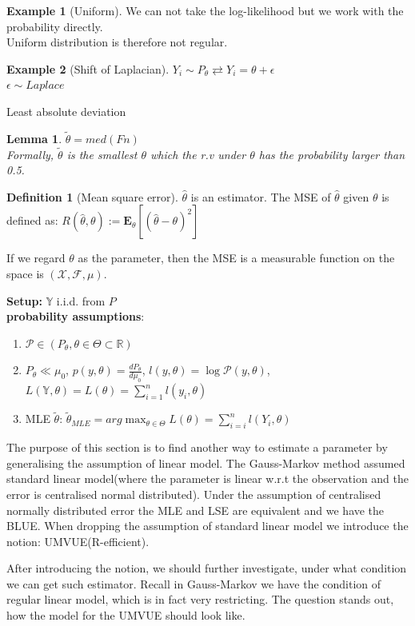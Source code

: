 \documentclass[a4paper,12pt, oneside, fleqn]{book}
\newtheorem{lemma}[theorem]{Lemma}
\theoremstyle{definition}
\newtheorem{definition}{Definition}[section]
\newtheorem*{example}{Example}
\theoremstyle{remark}
\begin{document}
\begin{example}[Uniform]
	We can not take the log-likelihood but we work with the probability directly.\\
	Uniform distribution is therefore not regular. 
\end{example}

\begin{example}[Shift of Laplacian]
	$Y_i \sim P_\theta \rightleftarrows Y_i = \theta + \epsilon$\\
	$\epsilon \sim Laplace$
	
	Least absolute deviation
\end{example}

\begin{lemma}
	$\tilde{\theta} = med (Fn)$ \\
	Formally, $\tilde{\theta}$ is the smallest $\theta$ which the r.v under $\theta$ has the probability larger than 0.5.
\end{lemma}


\begin{definition}[Mean square error]
\(\hat{\theta} \) is an estimator. The MSE of \( \hat{\theta} \) given \( \theta \) is defined as:
\( R(\hat{\theta}, \theta) := \mathbf{E}_{\theta}[(\hat{\theta} - \theta)^2] \)\par
If we regard $\theta$ as the parameter, then the MSE is a measurable function on the space is \( (\mathcal{X}, \mathcal{F}, \mu) \). 
\end{definition}



\textbf{Setup:} $\mathbb{Y}$ i.i.d. from $P$\\
\textbf{probability assumptions}:
\begin{enumerate}
	\item $\mathcal{P} \in (P_\theta, \theta \in \Theta \subset \mathbb{R})$
	\item $P_\theta \ll \mu_0$, \quad $p(y, \theta) = \frac{dP_\theta}{d\mu_0}$, \quad $l(y, \theta) = \log \mathcal{P}(y, \theta)$, \quad $L(\mathbb{Y}, \theta) = L(\theta) = \sum_{i = 1}^n l(y_i, \theta)$
	\item MLE $\tilde{\theta}$: $\tilde{\theta}_{MLE} = arg \max_{\theta \in \Theta} L(\theta) = \sum_{i = i}^n l(Y_i, \theta)$
\end{enumerate} 


The purpose of this section is to find another way to estimate a parameter by generalising the assumption of linear model. The Gauss-Markov method assumed standard linear model(where the parameter is linear w.r.t the observation and the error is centralised normal distributed). Under the assumption of centralised normally distributed error the MLE and LSE are equivalent and we have the BLUE. When dropping the assumption of standard linear model we introduce the notion: UMVUE(R-efficient).\par 
After introducing the notion, we should further investigate, under what condition we can get such estimator. Recall in Gauss-Markov we have the condition of regular linear model, which is in fact very restricting. The question stands out, how the model for the UMVUE should look like.\par 
\end{document}
